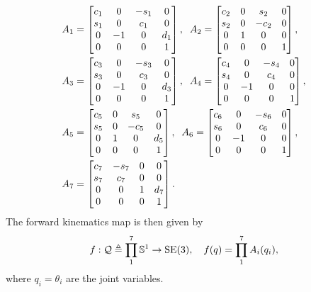 \begin{align}
  \begin{split}
    A_1 &= \begin{bmatrix} c_1 & 0 & -s_1 & 0 \\ s_1 & 0 & c_1 & 0 \\ 0 & -1 & 0 & d_1 \\ 0 & 0 & 0 & 1\end{bmatrix}, \;\;
    A_2 = \begin{bmatrix} c_2 & 0 & s_2 & 0 \\ s_2 & 0 & -c_2 & 0 \\ 0 & 1 & 0 & 0 \\ 0 & 0 & 0 & 1\end{bmatrix}, \\
    A_3 &= \begin{bmatrix} c_3 & 0 & -s_3 & 0 \\ s_3 & 0 & c_3 & 0 \\ 0 & -1 & 0 & d_3 \\ 0 & 0 & 0 & 1\end{bmatrix}, \;\;
    A_4 = \begin{bmatrix} c_4 & 0 & -s_4 & 0 \\ s_4 & 0 & c_4 & 0 \\ 0 & -1 & 0 & 0 \\ 0 & 0 & 0 & 1\end{bmatrix}, \\
    A_5 &= \begin{bmatrix} c_5 & 0 & s_5 & 0 \\ s_5 & 0 & -c_5 & 0 \\ 0 & 1 & 0 & d_5 \\ 0 & 0 & 0 & 1\end{bmatrix}, \;\;
    A_6 = \begin{bmatrix} c_6 & 0 & -s_6 & 0 \\ s_6 & 0 & c_6 & 0 \\ 0 & -1 & 0 & 0 \\ 0 & 0 & 0 & 1\end{bmatrix}, \\
    A_7 &= \begin{bmatrix} c_7 & -s_7 & 0 & 0 \\ s_7 & c_7 & 0 & 0 \\ 0 & 0 & 1 & d_7 \\ 0 & 0 & 0 & 1\end{bmatrix}. \\
  \end{split}
\end{align}
%
The forward kinematics map is then given by \[ f: \mathcal{Q} \triangleq \prod_1^7
\mathbb{S}^1 \rightarrow \mathrm{SE}(3), \quad f(q) = \prod_1^7 A_i(q_i), \]
%
where $q_i = \theta_i$ are the joint variables.

